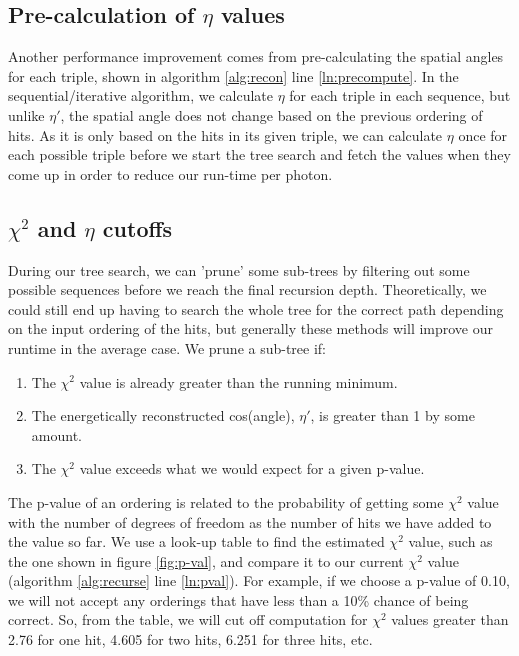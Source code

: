 \subsection{Pre-calculation of $\eta$ values}
Another performance improvement comes from pre-calculating the spatial angles for each triple, shown in algorithm \ref{alg:recon} line \ref{ln:precompute}. In the sequential/iterative algorithm, we calculate $\eta$ for each triple in each sequence, but unlike $\eta'$, the spatial angle does not change based on the previous ordering of hits. As it is only based on the hits in its given triple, we can calculate $\eta$ once for each possible triple before we start the tree search and fetch the values when they come up in order to reduce our run-time per photon.

\subsection{$\chi^2$ and $\eta$ cutoffs}

During our tree search, we can 'prune' some sub-trees by filtering out some possible sequences before we reach the final recursion depth. Theoretically, we could still end up having to search the whole tree for the correct path depending on the input ordering of the hits, but generally these methods will improve our runtime in the average case. We prune a sub-tree if:
\begin{enumerate}
    \item The $\chi^2$ value is already greater than the running minimum.
    \item The energetically reconstructed cos(angle), $\eta'$, is greater than 1 by some amount.
    \item The $\chi^2$ value exceeds what we would expect for a given p-value.
\end{enumerate}
The p-value of an ordering is related to the probability of getting some $\chi^2$ value with the number of degrees of freedom as the number of hits we have added to the value so far. We use a look-up table to find the estimated $\chi^2$ value, such as the one shown in figure \ref{fig:p-val}, and compare it to our current $\chi^2$ value (algorithm \ref{alg:recurse} line \ref{ln:pval}). For example, if we choose a p-value of 0.10, we will not accept any orderings that have less than a 10\% chance of being correct. So, from the table, we will cut off computation for $\chi^2$ values greater than 2.76 for one hit, 4.605 for two hits, 6.251 for three hits, etc.


